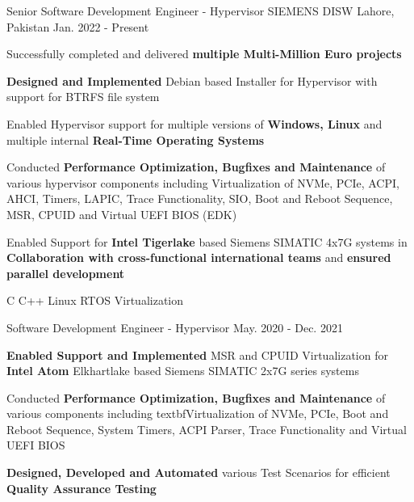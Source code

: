 

\begin{cventries}

  \cventry
    {Senior Software Development Engineer - Hypervisor} %
    {SIEMENS DISW} %
    {Lahore, Pakistan} %
    {Jan. 2022 - Present} %
    {
      \begin{cvitems} %
        \item Successfully completed and delivered \textbf{multiple Multi-Million Euro projects}
        \item \textbf{Designed and Implemented} Debian based Installer for Hypervisor with support for BTRFS file system
        \item Enabled Hypervisor support for multiple versions of \textbf{Windows, Linux} and multiple internal \textbf{Real-Time Operating Systems}
        \item Conducted \textbf{Performance Optimization, Bugfixes and Maintenance} of various hypervisor components including Virtualization of NVMe, PCIe, ACPI, AHCI, Timers, LAPIC, Trace Functionality, SIO, Boot and Reboot Sequence, MSR, CPUID and Virtual UEFI BIOS (EDK)
        \item Enabled Support for \textbf{Intel Tigerlake} based Siemens SIMATIC 4x7G systems in \textbf{Collaboration with cross-functional international teams} and \textbf{ensured parallel development}
      \end{cvitems}
    }
    {C \acvSep C++ \acvSep Linux \acvSep RTOS \acvSep Virtualization}

  \cventry
    {Software Development Engineer - Hypervisor} %
    {} %
    {} %
    {May. 2020 - Dec. 2021} %
    {
      \begin{cvitems} %
        \item \textbf{Enabled Support and Implemented} MSR and CPUID Virtualization for \textbf{Intel Atom} Elkhartlake based Siemens SIMATIC 2x7G series systems
        \item Conducted \textbf{Performance Optimization, Bugfixes and Maintenance} of various components including textbf{Virtualization} of NVMe, PCIe, Boot and Reboot Sequence, System Timers, ACPI Parser, Trace Functionality and Virtual UEFI BIOS
        \item \textbf{Designed, Developed and Automated} various Test Scenarios for efficient \textbf{Quality Assurance Testing}
      \end{cvitems}
    }
    {}%


\end{cventries}
